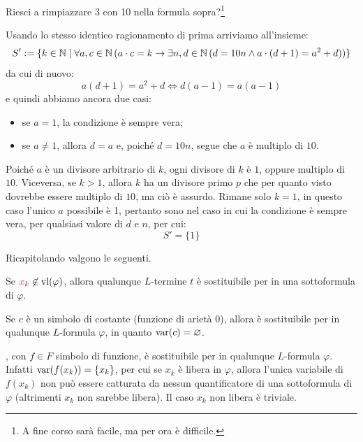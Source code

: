 \begin{exercise}
    [Difficile]
    Riesci a rimpiazzare 3 con 10 nella formula sopra?\footnote{A fine corso sarà facile, ma per ora è difficile.}
\end{exercise}

\begin{soln}
    Usando lo stesso identico ragionamento di prima arriviamo all'insieme:
    \[ S' := \{ k \in \mathbb N \mid \forall a,c \in \mathbb N \, (a \cdot c = k \to \exists n,d \in \mathbb N \, (d = 10n \land a \cdot (d+1) = a^2 + d)) \} \]
    da cui di nuovo:
    \[ a(d+1) = a^2 + d \iff d(a-1) = a(a-1) \]
    e quindi abbiamo ancora due casi:
    \begin{itemize}
        \item se $a = 1$, la condizione è sempre vera;
        \item se $a \neq 1$, allora $d = a$ e, poiché $d = 10n$, segue che $a$ è multiplo di $10$.
    \end{itemize}
    Poiché $a$ è un divisore arbitrario di $k$, ogni divisore di $k$ è $1$, oppure multiplo di $10$. Viceversa, se $k >1$, allora $k$ ha un divisore primo $p$ che per quanto visto dovrebbe essere multiplo di $10$, ma ciò è assurdo.
    Rimane solo $k = 1$, in questo caso l'unico $a$ possibile è 1, pertanto sono nel caso in cui la condizione è sempre vera, per qualsiasi valore di $d$ e $n$, per cui:
    \[ S' = \{ 1 \} \]
\end{soln}

Ricapitolando valgono le seguenti.

\begin{remark}
    Se $\textcolor{purple}{x_k} \not \in \operatorname{vl}(\varphi)$, allora qualunque $L$-termine $t$ è sostituibile per  in una sottoformula di $\varphi$.
\end{remark}

\begin{remark}
    Se $c$ è un simbolo di costante (funzione di arietà 0), allora è sostituibile per  in qualunque $L$-formula $\varphi$, in quanto $\operatorname{var}(c) = \varnothing$.
\end{remark}

\begin{remark} 
    , con $f \in F$ simbolo di funzione, è sostituibile per  in qualunque $L$-formula $\varphi$. Infatti $\operatorname{var}(f(x_k)) = \{x_k\}$, per cui
    se $x_k$ è libera in $\varphi$, allora l'unica variabile di $f(x_k)$ non può essere catturata da nessun quantificatore di una sottoformula di $\varphi$ (altrimenti $x_k$ non sarebbe libera).
    Il caso $x_k$ non libera è triviale.
\end{remark}

